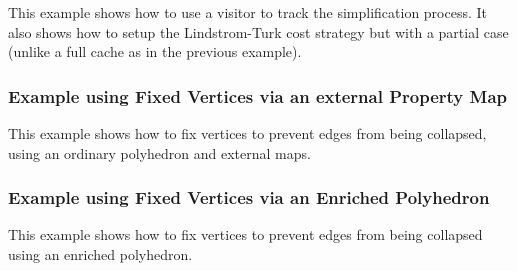 This example shows how to use a visitor to track the simplification process. It also shows how to setup the Lindstrom-Turk cost strategy but with a partial case (unlike a full cache as in the previous example).



\subsubsection{Example using Fixed Vertices via an external Property Map}

This example shows how to fix vertices to prevent edges from being collapsed, using an ordinary polyhedron and external maps.



\subsubsection{Example using Fixed Vertices via an Enriched Polyhedron}

This example shows how to fix vertices to prevent edges from being collapsed using an enriched polyhedron.




